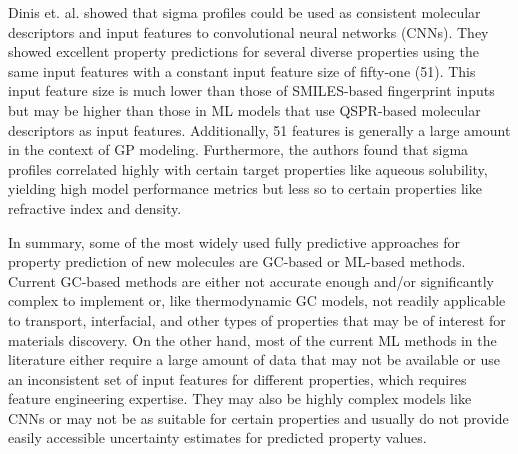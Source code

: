 \documentclass[journal=jacsat,manuscript=article]{achemso}
\begin{document}
Dinis et. al. showed that sigma profiles could be used as consistent molecular descriptors and input features to convolutional neural networks (CNNs). They showed excellent property predictions for several diverse properties using the same input features with a constant input feature size of fifty-one (51). This input feature size is much lower than those of SMILES-based fingerprint inputs but may be higher than those in ML models that use QSPR-based molecular descriptors as input features. Additionally, 51 features is generally a large amount in the context of GP modeling. Furthermore, the authors found that sigma profiles correlated highly with certain target properties like aqueous solubility, yielding high model performance metrics but less so to certain properties like refractive index and density.

In summary, some of the most widely used fully predictive approaches for property prediction of new molecules are GC-based or ML-based methods. Current GC-based methods are either not accurate enough and/or significantly complex to implement or, like thermodynamic GC models, not readily applicable to transport, interfacial, and other types of properties that may be of interest for materials discovery. On the other hand, most of the current ML methods in the literature either require a large amount of data that may not be available or use an inconsistent set of input features for different properties, which requires feature engineering expertise. They may also be highly complex models like CNNs or may not be as suitable for certain properties and usually do not provide easily accessible uncertainty estimates for predicted property values.
\end{document}
